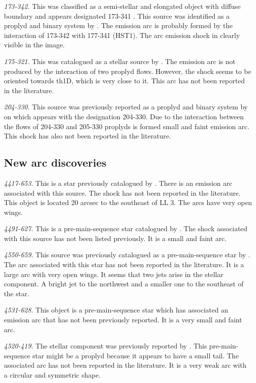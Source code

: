 \documentclass[iop, apj]{emulateapj}
\renewcommand\clearpage{}
\begin{document}
\textit{173-342.} This was classified as a semi-stellar and elongated object with diffuse boundary and appears designated 173-341 \citet{Odell:1994}. This source was identified as a proplyd and binary system by \citet{Ricci:2008a}. The emission arc is probably formed by the interaction of 173-342 with 177-341 (HST1). The arc emission shock in clearly visible in the image. 

\textit{175-321.} This was catalogued as a stellar source by \citet{ODell:1996a}. The emission arc is not produced by the interaction of two proplyd flows. However, the shock seems to be oriented towards th1D, which is very close to it. This arc has not been reported in the literature.

\textit{204-330.} This source was previously reported as a proplyd and binary system by \citet{Ricci:2008a} on which appears with the designation 204-330. Due to the interaction between the flows of 204-330 and 205-330 proplyds is formed small and faint emission arc. This shock has also not been reported in the literature.

\clearpage
\subsection{New arc discoveries}
\label{sec:new}

\textit{4417-653.} This is a star previously catalogued by \citet{Hillenbrand:1997}. There is an emission arc associated with this source. The shock has not been reported in the literature. This object is located 20 arcsec to the southeast of LL 3. The arcs have very open wings.  

\textit{4491-627.} This is a pre-main-sequence star catalogued by \citet{Parihar:2009}. The shock associated with this source has not been listed previously. It is a small and faint arc.

\textit{4550-659.} This source was previously catalogued as a pre-main-sequence star by \citet{Parihar:2009}. The arc associated with this star has not been reported in the literature. It is a large arc with very open wings. It seems that two jets arise in the stellar component. A bright jet to the northwest and a smaller one to the southeast of the star.  

\textit{4531-628.} This object is a pre-main-sequence star \citep{Rio:2009} which has associated an emission arc that has not been previously reported. It is a very small and faint arc.

\textit{4520-419.} The stellar component was previously reported by \citet{Parihar:2009}. This pre-main-sequence star might be a proplyd because it appears to have a small tail. The associated arc has not been reported in the literature. It is a very weak arc with a circular and symmetric shape. 
\end{document}
